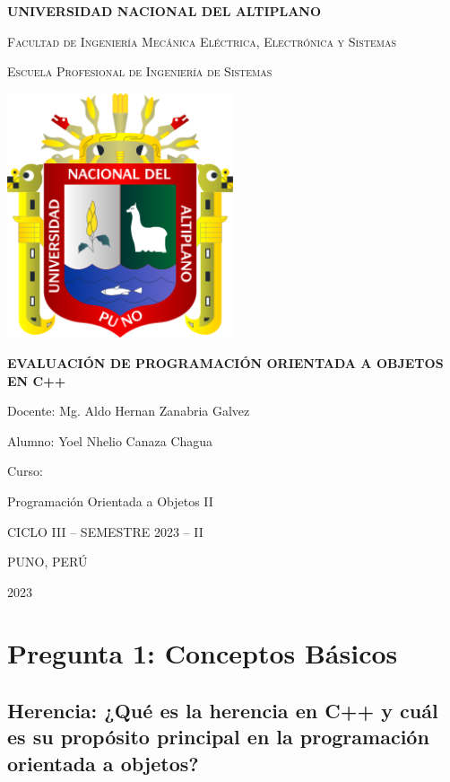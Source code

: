 \documentclass[11pt,a4paper]{article}
\begin{document}
\begin{titlepage}
\centering


{\bfseries\LARGE UNIVERSIDAD NACIONAL DEL ALTIPLANO\par}
{\scshape\LARGE Facultad de Ingeniería Mecánica Eléctrica, Electrónica y Sistemas\par}
{\scshape\LARGE Escuela Profesional de Ingeniería de Sistemas\par}
\vspace{1cm}
{\includegraphics[width=0.5\textwidth]{images/1-unap.png}\par}
\vspace{0.5cm}
{\bfseries\LARGE EVALUACIÓN DE PROGRAMACIÓN ORIENTADA A OBJETOS EN C++\par}
\vspace{1cm}
{\LARGE Docente: Mg. Aldo Hernan Zanabria Galvez \par}
{\LARGE Alumno: Yoel Nhelio Canaza Chagua \par}
\vspace{1cm}
{\LARGE Curso: \par}
{\LARGE Programación Orientada a Objetos II \par}
\vspace{1cm}
{\LARGE CICLO III – SEMESTRE 2023 – II \par}
{\LARGE PUNO, PERÚ \par}
{\LARGE 2023 \par}


\end{titlepage}

\section{Pregunta 1: Conceptos Básicos}
\subsection{Herencia: ¿Qué es la herencia en C++ y cuál es su propósito principal en la programación orientada a objetos?}
\end{document}
